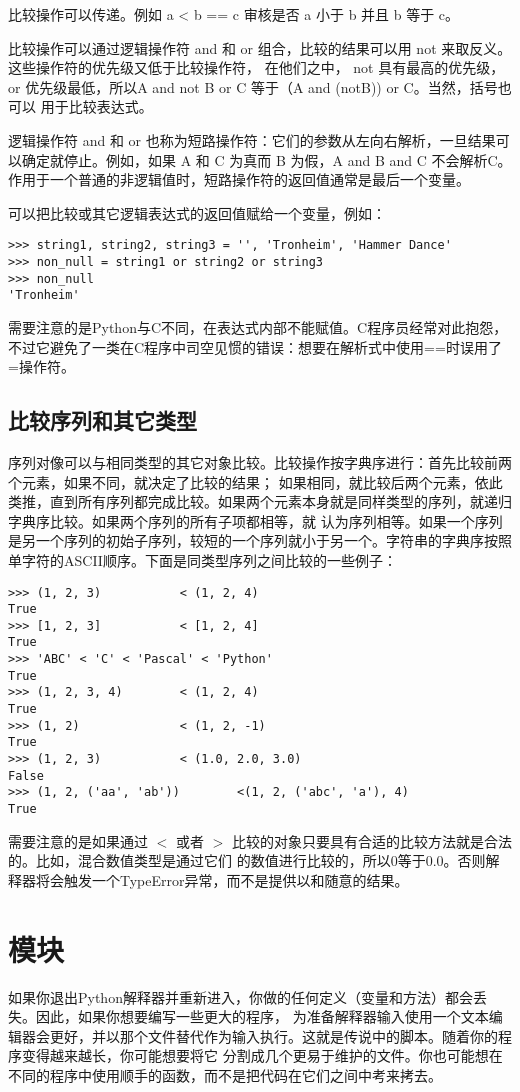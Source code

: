 \documentclass[UTF8]{ctexart}
\begin{document}
比较操作可以传递。例如 a < b == c 审核是否 a 小于 b 并且 b 等于 c。

比较操作可以通过逻辑操作符 and 和 or 组合，比较的结果可以用 not 来取反义。这些操作符的优先级又低于比较操作符，
在他们之中， not 具有最高的优先级，or 优先级最低，所以A and not B or C 等于（A and (notB)) or C。当然，括号也可以
用于比较表达式。

逻辑操作符 and 和 or 也称为短路操作符：它们的参数从左向右解析，一旦结果可以确定就停止。例如，如果 A 和 C 为真而
B 为假，A and B and C 不会解析C。作用于一个普通的非逻辑值时，短路操作符的返回值通常是最后一个变量。

可以把比较或其它逻辑表达式的返回值赋给一个变量，例如：
\begin{verbatim}
>>> string1, string2, string3 = '', 'Tronheim', 'Hammer Dance'
>>> non_null = string1 or string2 or string3
>>> non_null
'Tronheim'
\end{verbatim}

需要注意的是Python与C不同，在表达式内部不能赋值。C程序员经常对此抱怨，不过它避免了一类在C程序中司空见惯的错误：想要在解析式中使用==时误用了=操作符。

\subsection{比较序列和其它类型}
序列对像可以与相同类型的其它对象比较。比较操作按字典序进行：首先比较前两个元素，如果不同，就决定了比较的结果；
如果相同，就比较后两个元素，依此类推，直到所有序列都完成比较。如果两个元素本身就是同样类型的序列，就递归字典序比较。如果两个序列的所有子项都相等，就
认为序列相等。如果一个序列是另一个序列的初始子序列，较短的一个序列就小于另一个。字符串的字典序按照单字符的ASCII顺序。下面是同类型序列之间比较的一些例子：
\begin{verbatim}
>>> (1, 2, 3)           < (1, 2, 4)
True
>>> [1, 2, 3]           < [1, 2, 4]
True
>>> 'ABC' < 'C' < 'Pascal' < 'Python'
True
>>> (1, 2, 3, 4)        < (1, 2, 4)
True
>>> (1, 2)              < (1, 2, -1)
True
>>> (1, 2, 3)           < (1.0, 2.0, 3.0)
False
>>> (1, 2, ('aa', 'ab'))        <(1, 2, ('abc', 'a'), 4)
True
\end{verbatim}

需要注意的是如果通过 $<$ 或者 $>$ 比较的对象只要具有合适的比较方法就是合法的。比如，混合数值类型是通过它们
的数值进行比较的，所以0等于0.0。否则解释器将会触发一个TypeError异常，而不是提供以和随意的结果。

\section{模块}
如果你退出Python解释器并重新进入，你做的任何定义（变量和方法）都会丢失。因此，如果你想要编写一些更大的程序，
为准备解释器输入使用一个文本编辑器会更好，并以那个文件替代作为输入执行。这就是传说中的脚本。随着你的程序变得越来越长，你可能想要将它
分割成几个更易于维护的文件。你也可能想在不同的程序中使用顺手的函数，而不是把代码在它们之间中考来拷去。
\end{document}
